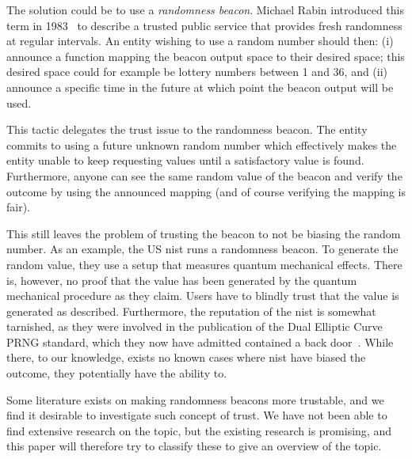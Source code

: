 The solution could be to use a \emph{randomness beacon}. Michael Rabin introduced this term in 1983~\cite{rabin1983transaction} to describe a trusted public service that provides fresh randomness at regular intervals. An entity wishing to use a random number should then: (i) announce a function mapping the beacon output space to their desired space; this desired space could for example be lottery numbers between 1 and 36, and (ii) announce a specific time in the future at which point the beacon output will be used.

This tactic delegates the trust issue to the randomness beacon. The entity commits to using a future unknown random number which effectively makes the entity unable to keep requesting values until a satisfactory value is found. Furthermore, anyone can see the same random value of the beacon and verify the outcome by using the announced mapping (and of course verifying the mapping is fair).

This still leaves the problem of trusting the beacon to not be biasing the random number. As an example, the US \gls{nist} runs a randomness beacon. To generate the random value, they use a setup that measures quantum mechanical effects.
There is, however, no proof that the value has been generated by the quantum mechanical procedure as they claim. Users have to blindly trust that the value is generated as described.
Furthermore, the reputation of the \gls{nist} is somewhat tarnished, as they were involved in the publication of the Dual Elliptic Curve PRNG standard, which they now have admitted contained a back door~\cite{nist2014backdoor}. While there, to our knowledge, exists no known cases where \gls{nist} have biased the outcome, they potentially have the ability to.

Some literature exists on making randomness beacons more trustable, and we find it desirable to investigate such concept of trust. We have not been able to find extensive research on the topic, but the existing research is promising, and this paper will therefore try to classify these to give an overview of the topic.

